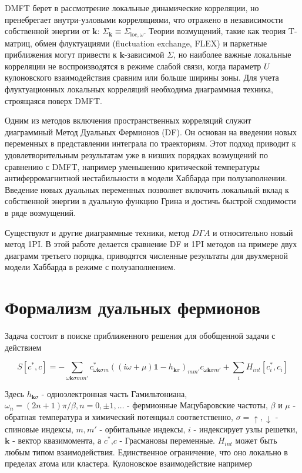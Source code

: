 \documentclass[11pt,a4paper]{report}
\begin{document}
DMFT берет в рассмотрение локальные динамические корреляции, но пренебрегает внутри-узловыми корреляциями, что отражено в независимости собственной энергии от $\mathbf{k}$: $\Sigma_\mathbf{k}\equiv \Sigma_{\text{loc},\omega}$. 
Теории возмущений, такие как теория T-матриц, обмен флуктуациями (fluctuation exchange, FLEX) и паркетные приближения\cite{bickers} могут привести к $\mathbf{k}$-зависимой $\Sigma$,
но наиболее важные локальные корреляции не воспроизводятся в режиме слабой связи, когда параметр $U$ кулоновского взаимодействия сравним или больше ширины зоны.
Для учета флуктуационных локальных корреляций необходима диаграммная техника, строящаяся поверх DMFT.

Одним из методов включения пространственных корреляций служит диаграммный Метод Дуальных Фермионов (DF)\cite{PhysRevB.77.033101}. Он основан на введении новых переменных в представлении интеграла по траекториям.
Этот подход приводит к удовлетворительным результатам уже в низших порядках возмущений по сравнению с DMFT, например уменьшению критической температуры антиферромагнитной нестабильности в модели Хаббарда 
при полузаполнении\cite{PhysRevB.77.195105}. Введение новых дуальных переменных позволяет включить локальный вклад к собственной энергии в дуальную функцию Грина и достичь быстрой сходимости в ряде возмущений.

Существуют и другие диаграммные техники, метод $D\Gamma A$\cite{toschi2007dynamical}\cite{katanin2009comparing} и относительно новый метод 1PI\cite{katanin}. 
В этой работе делается сравнение DF и 1PI методов на примере двух диаграмм третьего порядка, приводятся численные результаты для двухмерной модели Хаббарда в режиме с полузаполнением.

\section{Формализм дуальных фермионов}
Задача состоит в поиске приближенного решения для обобщенной задачи с действием

\begin{equation}
\label{action}
 S\left[c^*,c\right] = - \sum_{\omega\mathbf{k}\sigma m m'} c^*_{\omega\mathbf{k}\sigma m} ((i\omega+\mu)\mathbf{1}-h_{\mathbf{k}\sigma})_{m m'}c_{\omega\mathbf{k}\sigma m'} + \sum_i H_{int}[c_i^*,c_i]
\end{equation}

Здесь $h_{\mathbf{k}\sigma}$ - одноэлектронная часть Гамильтониана, $\omega_n=(2n+1)\pi/\beta,n = 0,\pm 1,\dots$ - фермионные Мацубаровские частоты, 
$\beta$ и $\mu$ - обратная температура и химический потенциал соответственно, $\sigma=\uparrow,\downarrow$ - спиновые индексы,
$m,m'$ - орбитальные индексы, $i$ - индексирует узлы решетки, $\mathbf{k}$ - вектор квазимомента, а $c^*$,$c$ - Грасмановы переменные. 
$H_{int}$ может быть любым типом взаимодействия. Единственное ограничение, что оно локально в пределах атома или кластера. Кулоновское взаимодействие например
\end{document}
